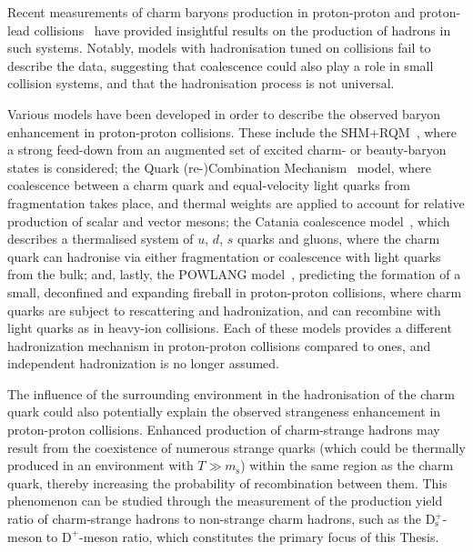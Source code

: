 Recent measurements of charm baryons production in proton-proton and proton-lead collisions~\cite{ALICE:2022exq,ALICE:xic0} have provided insightful results on the production of hadrons in such systems. Notably, models with hadronisation tuned on \ee collisions fail to describe the data, suggesting that coalescence could also play a role in small collision systems, and that the hadronisation process is not universal.

Various models have been developed in order to describe the observed baryon enhancement in proton-proton collisions. These include the SHM+RQM~\cite{He:2019tik,He:2022tod}, where a strong feed-down from an augmented set of excited charm- or beauty-baryon states is considered; the Quark (re-)Combination Mechanism~\cite{Song:2018tpv} model, where coalescence between a charm quark and equal-velocity light quarks from fragmentation takes place, and thermal weights are applied to account for relative production of scalar and vector mesons; the Catania coalescence model~\cite{Minissale:2020bif}, which describes a thermalised system of $u$, $d$, $s$ quarks and gluons, where the charm quark can hadronise via either fragmentation or coalescence with light quarks from the bulk; and, lastly, the POWLANG model~\cite{Beraudo:2023nlq}, predicting the formation of a small, deconfined and expanding fireball in proton-proton collisions, where charm quarks are subject to rescattering and hadronization, and can recombine with light quarks as in heavy-ion collisions. Each of these models provides a different hadronization mechanism in proton-proton collisions compared to \ee ones, and independent hadronization is no longer assumed. 

The influence of the surrounding environment in the hadronisation of the charm quark could also potentially explain the observed strangeness enhancement in proton-proton collisions. Enhanced production of charm-strange hadrons may result from the coexistence of numerous strange quarks (which could be thermally produced in an environment with $T \gg m_\mathrm{s}$) within the same region as the charm quark, thereby increasing the probability of recombination between them. This phenomenon can be studied through the measurement of the production yield ratio of charm-strange hadrons to non-strange charm hadrons, such as the $\mathrm{D_s^+}$-meson to $\mathrm{D^+}$-meson ratio, which constitutes the primary focus of this Thesis.

